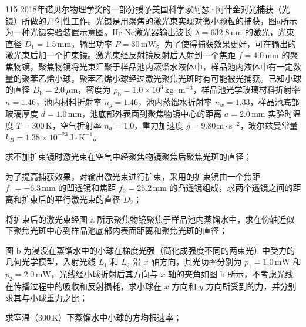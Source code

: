 \begin{problem}[第36届全国中学生物理竞赛决赛][光镊原理与实验分析]{115}
    2018年诺贝尔物理学奖的一部分授予美国科学家阿瑟·阿什金对光捕获（光镊）所做的开创性工作。光镊是用聚焦的激光束实现对微小颗粒的捕获，图a所示为一种光镊实验装置示意图。He-Ne激光器输出波长 $\lambda = 632.8\,\mathrm{nm}$ 的激光，光束直径 $D_{1} = 1.5\,\mathrm{mm}$，输出功率 $P = 30\,\mathrm{mW}$。为了使得捕获效果更好，可在输出的激光束后加一个扩束镜。激光束经反射镜反射后入射到一个焦距 $f = 4.0\,\mathrm{mm}$ 的聚焦物镜，聚焦物镜将光束汇聚于样品池内蒸馏水液体中，样品池内液体中有一定数量的聚苯乙烯小球，聚苯乙烯小球经过激光聚焦光斑时有可能被光捕获。已知小球的直径 $D_{\mathrm{b}} = 2.0\,\mu\mathrm{m}$，密度为 $\rho_{\mathrm{b}} = 1.0\times 10^{3}\,\mathrm{kg}\cdot \mathrm{m}^{-3}$，样品池光学玻璃材料折射率 $n = 1.46$，池内材料折射率 $n_{g}=1.46$，池内蒸馏水折射率 $n_{w}=1.33$，样品池底部玻璃厚度 $d=1.0\,\mathrm{mm}$，池底部外表面到聚焦物镜中心的距离 $a=2.0\,\mathrm{mm}$ 实验时温度 $T=300\,\mathrm{K}$，空气折射率 $n_{a}=1.0$，重力加速度 $g=9.80\,\mathrm{m\cdot s^{-2}}$，玻尔兹曼常量 $k_{B}=1.38\times10^{-23}\,\mathrm{J\cdot K^{-1}}$。
    \begin{subproblem}
        求不加扩束镜时激光束在空气中经聚焦物镜聚焦后聚焦光斑的直径；
    \end{subproblem}
    \begin{subproblem}
        为了提高捕获效果，对输出激光束进行扩束，采用的扩束镜由一个焦距 $f_{1} = -6.3\,\mathrm{mm}$ 的凹透镜和焦距 $f_{2} = 25.2\,\mathrm{mm}$ 的凸透镜组成，求两个透镜之间的距离和扩束后的平行激光束的直径 $D_{2}$；
    \end{subproblem}
    \begin{subproblem}
        将扩束后的激光束经图 a 所示聚焦物镜聚焦于样品池内蒸馏水中，求在傍轴近似下聚焦光斑中心到样品池底部内表面距离和聚焦光斑的直径；
    \end{subproblem}
    \begin{subproblem}
        图 b 为浸没在蒸馏水中的小球在梯度光强（简化成强度不同的两束光）中受力的几何光学模型，入射光线 $L_{1}$ 和 $L_{2}$ 沿 $x$ 轴方向，其光功率分别为 $p_{1}=1.0\,\mathrm{mW}$ 和 $p_{2}=2.0\,\mathrm{mW}$，光线经小球折射后其方向与 $x$ 轴的夹角如图 b 所示，不考虑光线在传播过程中的吸收和反射损耗，求小球在 $x$ 方向和 $y$ 方向所受到的力，并分别求其与小球重力之比；
    \end{subproblem}
    \begin{subproblem}
        求室温（$300\,\mathrm{K}$）下蒸馏水中小球的方均根速率；
    \end{subproblem}

\end{problem}
